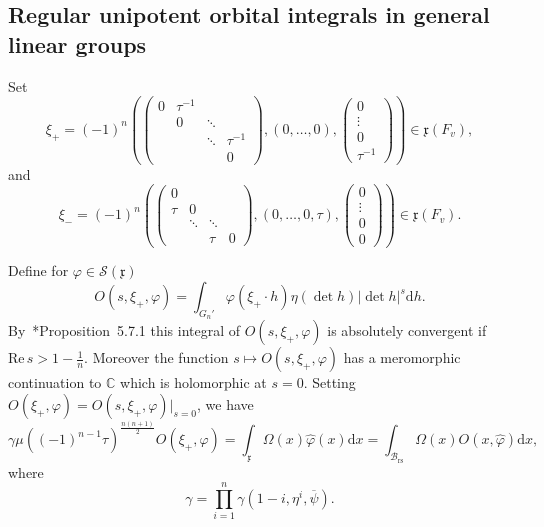 \documentclass[letterpaper,11pt]{amsart}
\newcommand{\fx}{\mathfrak{x}}
\newcommand{\C}{\mathbb{C}}
\newcommand{\cB}{\mathcal{B}}
\newcommand{\cS}{\mathcal{S}}
\newcommand{\rd}{\mathrm{d}}
\newcommand{\re}{\mathrm{Re}\,}
\newcommand{\<}{\negthickspace}
\providecommand{\abs}[1]{\lvert#1\rvert}
\DeclareMathOperator{\rs}{rs}
\theoremstyle{definition}
\theoremstyle{plain}
\theoremstyle{remark}
\numberwithin{equation}{section}
\begin{document}
\subsection{Regular unipotent orbital integrals in general linear groups}

Set
    \[
    \xi_+ = (-1)^n \left( \begin{pmatrix} 0 & \tau^{-1}\\
    & 0 & \ddots \\ & & \ddots & \tau^{-1} \\ &&& 0 \end{pmatrix},
    (0, \hdots, 0),
    \begin{pmatrix} 0 \\ \vdots \\ 0 \\ \tau^{-1} \end{pmatrix} \right)
    \in \fx(F_v),
    \]
and
    \[
    \xi_- = (-1)^n \left( \begin{pmatrix} 0\\
    \tau & 0 \\ &\ddots & \ddots \\ && \tau & 0 \end{pmatrix},
    (0, \hdots, 0, \tau),
    \begin{pmatrix} 0 \\ \vdots \\ 0 \\ 0 \end{pmatrix} \right)
    \in \fx(F_v).
    \]



Define for $\varphi \in \cS(\fx)$
    \[
    O(s, \xi_+, \varphi) = \int_{G_n'} \varphi(\xi_+\cdot h) \eta(\det h)
    \abs{\det h}^s \rd h.
    \]
By~\cite{BP1}*{Proposition~5.7.1} this integral of $O(s, \xi_+, \varphi)$ is
absolutely convergent if $\re s> 1- \frac{1}{n}$. Moreover the function $s
\mapsto O(s, \xi_+, \varphi)$ has a meromorphic continuation to $\C$ which is
holomorphic at $s = 0$. Setting $O(\xi_+, \varphi) = O(s, \xi_+,
\varphi)|_{s= 0}$, we have
    \begin{equation}    \label{eq:reg_nilpotent}
    \gamma \mu((-1)^{n-1} \tau)^{\frac{n(n+1)}{2}}
    O(\xi_+, \varphi) =
    \int_{\fx} \Omega(x) \widehat{\varphi}(x) \rd x
    = \int_{\cB_{\rs}} \Omega(x) O(x, \widehat{\varphi}) \rd x,
    \end{equation}
where
    \begin{equation}    \label{eq:gamma_constant}
    \gamma = \prod_{i = 1}^n \gamma(1-i, \eta^i, \overline{\psi}).
    \end{equation}
\end{document}
